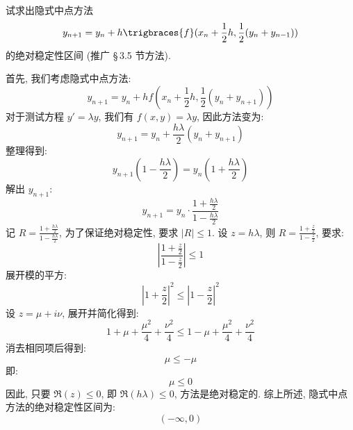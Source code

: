 \documentclass[lang = zh]{iwork}
\begin{document}
\begin{prob}
  试求出隐式中点方法
  \begin{equation*}
    y_{n + 1} = y_n + h \trigbraces{f}(x_n + \frac{1}{2} h, \frac{1}{2} (y_n + y_{n - 1}))
  \end{equation*}
  的绝对稳定性区间 (推广 \S\,3.5 节方法).
\end{prob}
\begin{sol}
  首先, 我们考虑隐式中点方法:
  \begin{equation*}
    y_{n+1} = y_n + h f\left(x_n + \frac{1}{2} h, \frac{1}{2} (y_n + y_{n+1})\right)
  \end{equation*}
  对于测试方程 $y' = \lambda y$, 我们有 $f(x, y) = \lambda y$, 因此方法变为:
  \begin{equation*}
    y_{n+1} = y_n + \frac{h \lambda}{2} (y_n + y_{n+1})
  \end{equation*}
  整理得到:
  \begin{equation*}
    y_{n+1} \left(1 - \frac{h \lambda}{2}\right) = y_n \left(1 + \frac{h \lambda}{2}\right)
  \end{equation*}
  解出 $y_{n+1}$:
  \begin{equation*}
    y_{n+1} = y_n \cdot \frac{1 + \frac{h \lambda}{2}}{1 - \frac{h \lambda}{2}}
  \end{equation*}
  记 $R = \frac{1 + \frac{h \lambda}{2}}{1 - \frac{h \lambda}{2}}$, 为了保证绝对稳定性, 要求 $|R| \leqslant 1$.
  设 $z = h \lambda$, 则 $R = \frac{1 + \frac{z}{2}}{1 - \frac{z}{2}}$, 要求:
  \begin{equation*}
    \left| \frac{1 + \frac{z}{2}}{1 - \frac{z}{2}} \right| \leqslant 1
  \end{equation*}
  展开模的平方:
  \begin{equation*}
    \left|1 + \frac{z}{2}\right|^2 \leqslant \left|1 - \frac{z}{2}\right|^2
  \end{equation*}
  设 $z = \mu + i \nu$, 展开并简化得到:
  \begin{equation*}
    1 + \mu + \frac{\mu^2}{4} + \frac{\nu^2}{4} \leqslant 1 - \mu + \frac{\mu^2}{4} + \frac{\nu^2}{4}
  \end{equation*}
  消去相同项后得到:
  \begin{equation*}
    \mu \leqslant -\mu
  \end{equation*}
  即:
  \begin{equation*}
    \mu \leqslant 0
  \end{equation*}
  因此, 只要 $\Re(z) \leqslant 0$, 即 $\Re(h \lambda) \leqslant 0$, 方法是绝对稳定的.
  综上所述, 隐式中点方法的绝对稳定性区间为:
  \begin{equation*}
    (-\infty, 0)
  \end{equation*}
\end{sol}
\end{document}
